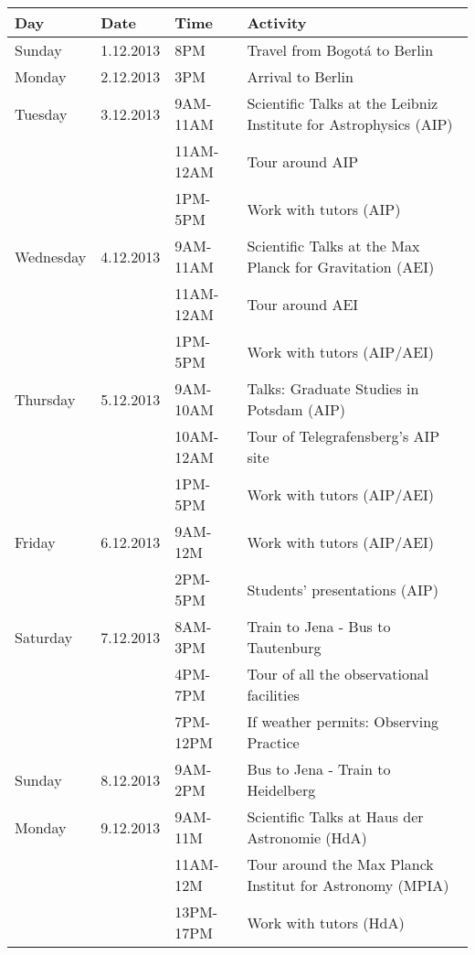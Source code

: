 \documentclass[12pt]{article}
\begin{document}
\begin{tabular}{p{2cm}p{2cm}p{2.5cm}p{7.0cm}}
Day & Date & Time & Activity\\\hline\hline

Sunday & 1.12.2013 & 8PM&	Travel from Bogot\'a to Berlin\\\hline

Monday &2.12.2013& 3PM & Arrival to Berlin\\\hline

Tuesday &3.12.2013& 9AM-11AM & Scientific Talks at the Leibniz Institute for Astrophysics (AIP)\\
 & & 11AM-12AM &Tour around AIP\\
 & & 1PM-5PM & Work with tutors (AIP)\\\hline

Wednesday &4.12.2013& 9AM-11AM &Scientific Talks at the Max Planck
for Gravitation (AEI)\\
 & & 11AM-12AM &Tour around AEI\\
 & & 1PM-5PM & Work with tutors (AIP/AEI)\\\hline

Thursday &5.12.2013 &  9AM-10AM & Talks: Graduate Studies in Potsdam (AIP)\\
& &  10AM-12AM & Tour of Telegrafensberg's AIP site\\
& & 1PM-5PM& Work with tutors (AIP/AEI)\\ \hline

Friday &6.12.2013& 9AM-12M & Work with tutors (AIP/AEI) \\		
      & & 2PM-5PM&  Students' presentations (AIP)\\\hline

Saturday & 7.12.2013& 8AM-3PM&	Train to Jena - Bus to Tautenburg\\
 & &4PM-7PM & Tour of all the observational facilities\\
 & &7PM-12PM & If weather permits: Observing Practice\\\hline

Sunday &8.12.2013& 9AM-2PM & Bus to Jena - Train to Heidelberg\\\hline

Monday &9.12.2013  & 9AM-11M & Scientific Talks at Haus der
Astronomie (HdA)\\ 
&  & 11AM-12M  & Tour around the Max Planck Institut for Astronomy (MPIA)\\
 & & 13PM-17PM & Work with tutors (HdA)\\\hline


\end{tabular}
\end{document}
